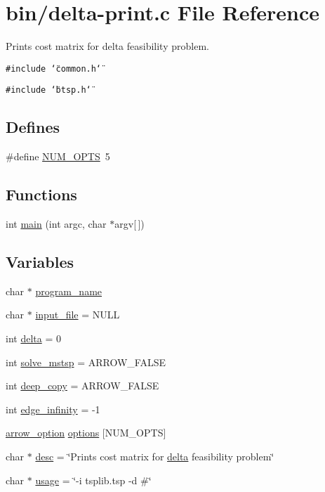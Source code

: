 \hypertarget{delta-print_8c}{
\section{bin/delta-print.c File Reference}
\label{delta-print_8c}
}
Prints cost matrix for delta feasibility problem.  


{\tt \#include \char`\"{}common.h\char`\"{}}\par
{\tt \#include \char`\"{}btsp.h\char`\"{}}\par
\subsection*{Defines}
\begin{CompactItemize}
\item 
\#define \hyperlink{delta-print_8c_9b58b2c4af931c8486a986c9deca40f5}{NUM\_\-OPTS}~5
\end{CompactItemize}
\subsection*{Functions}
\begin{CompactItemize}
\item 
int \hyperlink{delta-print_8c_0ddf1224851353fc92bfbff6f499fa97}{main} (int argc, char $\ast$argv\mbox{[}$\,$\mbox{]})
\end{CompactItemize}
\subsection*{Variables}
\begin{CompactItemize}
\item 
char $\ast$ \hyperlink{delta-print_8c_289c5900d90626d909f0a85d5a0ed61d}{program\_\-name}
\item 
char $\ast$ \hyperlink{delta-print_8c_a4f3a15de34c409bdec6ceacf93078ed}{input\_\-file} = NULL
\item 
int \hyperlink{delta-print_8c_1dfcb70b9229f2da17dd5922b87ecf2c}{delta} = 0
\item 
int \hyperlink{delta-print_8c_786cdab056142ae00a268cabebd5ced7}{solve\_\-mstsp} = ARROW\_\-FALSE
\item 
int \hyperlink{delta-print_8c_7298da576a5b127d04b4c46b3bc78821}{deep\_\-copy} = ARROW\_\-FALSE
\item 
int \hyperlink{delta-print_8c_61a12d5995172f376610cce2f19e5855}{edge\_\-infinity} = -1
\item 
\hyperlink{structarrow__option}{arrow\_\-option} \hyperlink{delta-print_8c_cea6a9709d519c143f30db401a0d0c72}{options} \mbox{[}NUM\_\-OPTS\mbox{]}
\item 
char $\ast$ \hyperlink{delta-print_8c_3aad16fd4bea1b9717f232ea75ad6449}{desc} = \char`\"{}Prints cost matrix for \hyperlink{delta-print_8c_1dfcb70b9229f2da17dd5922b87ecf2c}{delta} feasibility problem\char`\"{}
\item 
char $\ast$ \hyperlink{delta-print_8c_adebe2487a2c5240ab6cd02c83add0bf}{usage} = \char`\"{}-i tsplib.tsp -d \#\char`\"{}
\end{CompactItemize}


